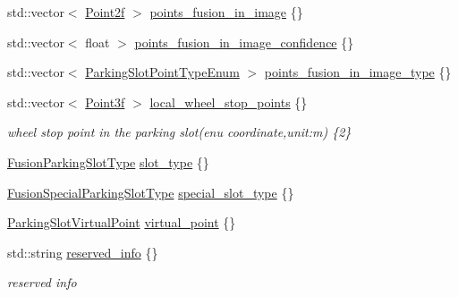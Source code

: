 \begin{DoxyCompactItemize}
\item 
std\+::vector$<$ \hyperlink{structmaf__perception__interface_1_1Point2f}{Point2f} $>$ \hyperlink{structmaf__perception__interface_1_1FusionParkingSlotData_af00a324c5a7e8f0d264edeed4db15336}{points\+\_\+fusion\+\_\+in\+\_\+image} \{\}
\item 
std\+::vector$<$ float $>$ \hyperlink{structmaf__perception__interface_1_1FusionParkingSlotData_ad9f6816d0ddf5f106f9ff3acbb8fc1c5}{points\+\_\+fusion\+\_\+in\+\_\+image\+\_\+confidence} \{\}
\item 
std\+::vector$<$ \hyperlink{structmaf__perception__interface_1_1ParkingSlotPointTypeEnum}{Parking\+Slot\+Point\+Type\+Enum} $>$ \hyperlink{structmaf__perception__interface_1_1FusionParkingSlotData_a348ef8124376ffbfdd216d8cd639d6e4}{points\+\_\+fusion\+\_\+in\+\_\+image\+\_\+type} \{\}
\item 
std\+::vector$<$ \hyperlink{structmaf__perception__interface_1_1Point3f}{Point3f} $>$ \hyperlink{structmaf__perception__interface_1_1FusionParkingSlotData_a24bb2288b4537b85bb2b05a13e200f06}{local\+\_\+wheel\+\_\+stop\+\_\+points} \{\}
\begin{DoxyCompactList}\small\item\em wheel stop point in the parking slot(enu coordinate,unit\+:m) \{2\} \end{DoxyCompactList}\item 
\hyperlink{structmaf__perception__interface_1_1FusionParkingSlotType}{Fusion\+Parking\+Slot\+Type} \hyperlink{structmaf__perception__interface_1_1FusionParkingSlotData_ac3e88840a764291ebe88f0b55a502c3b}{slot\+\_\+type} \{\}
\item 
\hyperlink{structmaf__perception__interface_1_1FusionSpecialParkingSlotType}{Fusion\+Special\+Parking\+Slot\+Type} \hyperlink{structmaf__perception__interface_1_1FusionParkingSlotData_a776bfe994e25d6f9d8a2b2a28046cb27}{special\+\_\+slot\+\_\+type} \{\}
\item 
\hyperlink{structmaf__perception__interface_1_1ParkingSlotVirtualPoint}{Parking\+Slot\+Virtual\+Point} \hyperlink{structmaf__perception__interface_1_1FusionParkingSlotData_a9085f8a689094610ed20635dfd079555}{virtual\+\_\+point} \{\}
\item 
std\+::string \hyperlink{structmaf__perception__interface_1_1FusionParkingSlotData_aae928e8bd03562f416a4de100f997d60}{reserved\+\_\+info} \{\}
\begin{DoxyCompactList}\small\item\em reserved info \end{DoxyCompactList}\end{DoxyCompactItemize}


